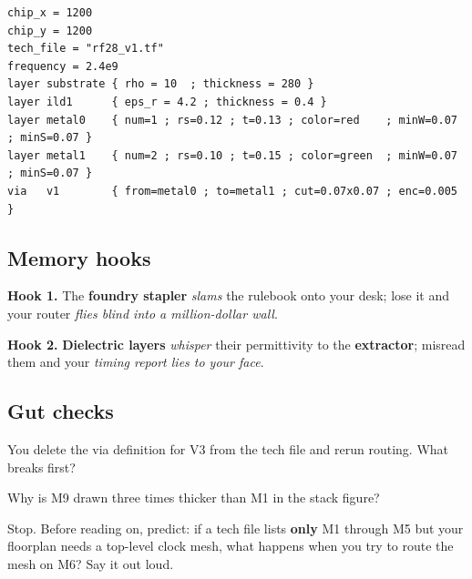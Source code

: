 \begin{lstlisting}[style=eda,caption={Skeleton of a tech file fragment (illustrative)}]
chip_x = 1200
chip_y = 1200
tech_file = "rf28_v1.tf"
frequency = 2.4e9
layer substrate { rho = 10  ; thickness = 280 }
layer ild1      { eps_r = 4.2 ; thickness = 0.4 }
layer metal0    { num=1 ; rs=0.12 ; t=0.13 ; color=red    ; minW=0.07 ; minS=0.07 }
layer metal1    { num=2 ; rs=0.10 ; t=0.15 ; color=green  ; minW=0.07 ; minS=0.07 }
via   v1        { from=metal0 ; to=metal1 ; cut=0.07x0.07 ; enc=0.005 }
\end{lstlisting}

\subsection*{Memory hooks}

\begin{pdnote}
\textbf{Hook 1.} The \textbf{foundry stapler} \textit{slams} the rulebook onto your desk; lose it and your router \textit{flies blind into a million-dollar wall}.

\textbf{Hook 2.} \textbf{Dielectric layers} \textit{whisper} their permittivity to the \textbf{extractor}; misread them and your \textit{timing report lies to your face}.
\end{pdnote}

\subsection*{Gut checks}

\begin{gut}
You delete the via definition for V3 from the tech file and rerun routing. What breaks first? 
\end{gut}

\begin{gut}
Why is M9 drawn three times thicker than M1 in the stack figure? 
\end{gut}

\begin{pausebox}
Stop. Before reading on, predict: if a tech file lists \textbf{only} M1 through M5 but your floorplan needs a top-level clock mesh, what happens when you try to route the mesh on M6? Say it out loud.
\end{pausebox}

